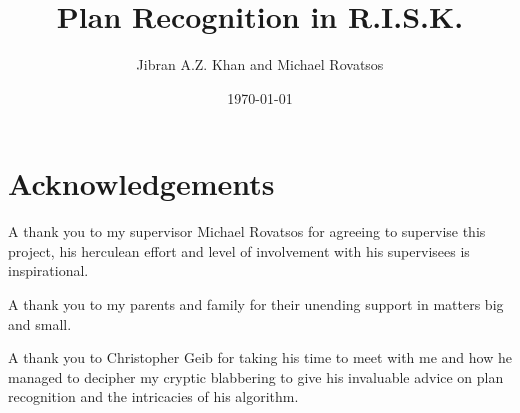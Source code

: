 \documentclass[parskip]{cs4rep}
\begin{document}
\title{Plan Recognition in R.I.S.K.}

\author{Jibran A.Z. Khan and Michael Rovatsos}



\date{\today}


\maketitle

\section*{Acknowledgements}

A thank you to my supervisor Michael Rovatsos for agreeing to supervise this project, his herculean effort and level of involvement with his supervisees is inspirational.

A thank you to my parents and family for their unending support in matters big and small. 

A thank you to Christopher Geib for taking his time to meet with me and how he managed to decipher my cryptic blabbering to give his invaluable advice on plan recognition and the intricacies of his algorithm. 
\end{document}
